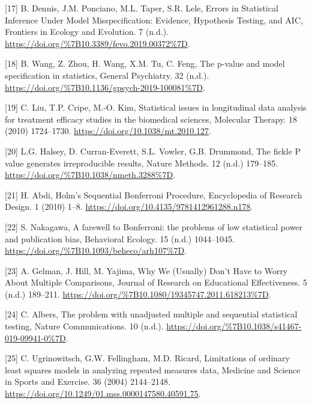 \documentclass[
]{article}
\begin{document}
\leavevmode\hypertarget{ref-dennis2019}{}%
{[}17{]} B. Dennis, J.M. Ponciano, M.L. Taper, S.R. Lele, Errors in Statistical Inference Under Model Misspecification: Evidence, Hypothesis Testing, and AIC, Frontiers in Ecology and Evolution. 7 (n.d.). \url{https://doi.org/\%7B10.3389/fevo.2019.00372\%7D}.

\leavevmode\hypertarget{ref-wang2019}{}%
{[}18{]} B. Wang, Z. Zhou, H. Wang, X.M. Tu, C. Feng, The p-value and model specification in statistics, General Psychiatry. 32 (n.d.). \url{https://doi.org/\%7B10.1136/gpsych-2019-100081\%7D}.

\leavevmode\hypertarget{ref-liu2010}{}%
{[}19{]} C. Liu, T.P. Cripe, M.-O. Kim, Statistical issues in longitudinal data analysis for treatment efficacy studies in the biomedical sciences, Molecular Therapy. 18 (2010) 1724--1730. \url{https://doi.org/10.1038/mt.2010.127}.

\leavevmode\hypertarget{ref-halsey2015}{}%
{[}20{]} L.G. Halsey, D. Curran-Everett, S.L. Vowler, G.B. Drummond, The fickle P value generates irreproducible results, Nature Methods. 12 (n.d.) 179--185. \url{https://doi.org/\%7B10.1038/nmeth.3288\%7D}.

\leavevmode\hypertarget{ref-abdi2010}{}%
{[}21{]} H. Abdi, Holm's Sequential Bonferroni Procedure, Encyclopedia of Research Design. 1 (2010) 1--8. \url{https://doi.org/10.4135/9781412961288.n178}.

\leavevmode\hypertarget{ref-nakagawa2004}{}%
{[}22{]} S. Nakagawa, A farewell to Bonferroni: the problems of low statistical power and publication bias, Behavioral Ecology. 15 (n.d.) 1044--1045. \url{https://doi.org/\%7B10.1093/beheco/arh107\%7D}.

\leavevmode\hypertarget{ref-gelman2012}{}%
{[}23{]} A. Gelman, J. Hill, M. Yajima, Why We (Usually) Don't Have to Worry About Multiple Comparisons, Journal of Research on Educational Effectiveness. 5 (n.d.) 189--211. \url{https://doi.org/\%7B10.1080/19345747.2011.618213\%7D}.

\leavevmode\hypertarget{ref-albers2019}{}%
{[}24{]} C. Albers, The problem with unadjusted multiple and sequential statistical testing, Nature Communications. 10 (n.d.). \url{https://doi.org/\%7B10.1038/s41467-019-09941-0\%7D}.

\leavevmode\hypertarget{ref-ugrinowitsch2004}{}%
{[}25{]} C. Ugrinowitsch, G.W. Fellingham, M.D. Ricard, Limitations of ordinary least squares models in analyzing repeated measures data, Medicine and Science in Sports and Exercise. 36 (2004) 2144--2148. \url{https://doi.org/10.1249/01.mss.0000147580.40591.75}.
\end{document}
